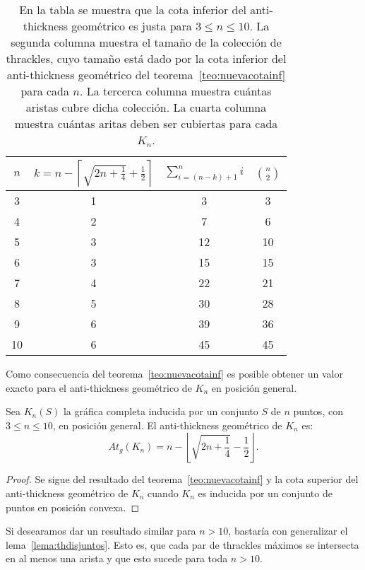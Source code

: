   \begin{table}[t]
    \centering
    \begin{tabular}{|c|c|c|c|}
      \hline
      $n$ & $k=n - \left\lceil\sqrt{2n+\frac{1}{4}} + \frac{1}{2}\right\rceil$ & $\sum^n_{i=(n-k) + 1}i$ & $\binom{n}{2}$\\[5pt] \hline\hline
      3   & 1  & 3 & 3 \\ \hline
      4   & 2  & 7 & 6 \\ \hline
      5   & 3  & 12 & 10 \\ \hline
      6   & 3  & 15 & 15 \\ \hline
      7   & 4  & 22 & 21 \\ \hline
      8   & 5  & 30 & 28 \\ \hline
      9   & 6  & 39 & 36 \\ \hline
      10  & 6  & 45 & 45 \\ \hline
    \end{tabular}
    \caption{En la tabla se muestra que la cota inferior del anti-thickness
    geométrico es justa para $3 \leq n \leq 10$. La segunda columna muestra el
    tamaño de la colección de thrackles, cuyo tamaño está dado por la cota
    inferior del anti-thickness geométrico del teorema~\ref{teo:nuevacotainf}
    para cada $n$. La tercerca columna muestra cuántas aristas cubre dicha
    colección. La cuarta columna muestra cuántas aritas deben ser cubiertas para
    cada $K_n$.}
    \label{table:atnuevacota}
  \end{table}

  Como consecuencia del teorema~\ref{teo:nuevacotainf} es posible obtener un valor exacto para el anti-thickness geométrico de $K_n$ en posición general.
  \begin{theorem}\label{teo:cotaexacta}
    Sea $K_n(S)$ la gráfica completa inducida por un conjunto $S$ de $n$ puntos, con $3 \leq n \leq 10$, en posición general. El anti-thickness geométrico de $K_n$ es:
    \[ At_g(K_n) = n - \left\lfloor\sqrt{2n + \frac{1}{4}} - \frac{1}{2}\right\rfloor. \]
  \end{theorem}
  \begin{proof}
    Se sigue del resultado del teorema~\ref{teo:nuevacotainf} y
    la cota superior del anti-thickness geométrico de $K_n$ cuando
    $K_n$ es inducida por un conjunto de puntos en posición convexa.
  \end{proof}

  Si desearamos dar un resultado similar para $n > 10$, bastaría con generalizar el
  lema~\ref{lema:thdisjuntos}. Esto es, que cada par de thrackles máximos se
  intersecta en al menos una arista y que esto sucede para toda $n > 10$.


